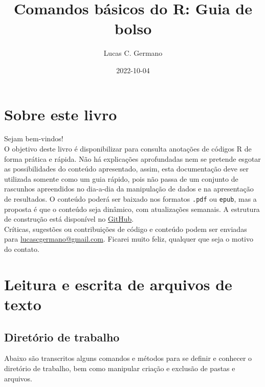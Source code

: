 \documentclass[
]{book}
\title{Comandos básicos do R: Guia de bolso}
\author{Lucas C. Germano}
\date{2022-10-04}
\theoremstyle{definition}
\theoremstyle{definition}
\theoremstyle{definition}
\theoremstyle{definition}
\theoremstyle{remark}
\begin{document}
\maketitle

{
\setcounter{tocdepth}{1}
\tableofcontents
}
\hypertarget{sobre-este-livro}{%
\chapter*{Sobre este livro}\label{sobre-este-livro}}

Sejam bem-vindos!\\
O objetivo deste livro é disponibilizar para consulta anotações de códigos R de forma prática e rápida. Não há explicações aprofundadas nem se pretende esgotar as possibilidades do conteúdo apresentado, assim, esta documentação deve ser utilizada somente como um guia rápido, pois não passa de um conjunto de rascunhos apreendidos no dia-a-dia da manipulação de dados e na apresentação de resultados. O conteúdo poderá ser baixado nos formatos \texttt{.pdf} ou \texttt{epub}, mas a proposta é que o conteúdo seja dinâmico, com atualizações semanais. A estrutura de construção está disponível no \href{https://github.com/lucascgmermano/guia_de_bolso.git}{GitHub}.\\
Críticas, sugestões ou contribuições de código e conteúdo podem ser enviadas para \url{lucascgermano@gmail.com}. Ficarei muito feliz, qualquer que seja o motivo do contato.

\hypertarget{leitura-e-escrita-de-arquivos-de-texto}{%
\chapter{Leitura e escrita de arquivos de texto}\label{leitura-e-escrita-de-arquivos-de-texto}}

\hypertarget{diretuxf3rio-de-trabalho}{%
\section{Diretório de trabalho}\label{diretuxf3rio-de-trabalho}}

Abaixo são transcritos alguns comandos e métodos para se definir e conhecer o diretório de trabalho, bem como manipular criação e exclusão de pastas e arquivos.
\end{document}
